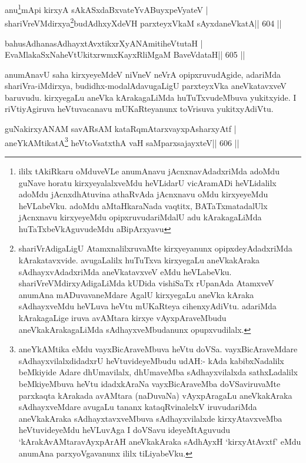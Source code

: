 \begin{shl}
anu\footnote{ililx tAkiRkaru oMduveVLe anumAnavu jAcnxnavAdadxriMda adoMdu guNave horatu kirxyeyalalxveMdu heVLidarU vicAramADi heVLidalilx adoMdu jAcnxdhAtuvina athaRvAda jAcnxnavu oMdu kirxyeyeMdu heVLabeVku. adoMdu aMtaHkaraNada vaqtitx, BATaTxmatadalUlx jAcnxnavu kirxyeyeMdu opipxruvudariMdalU adu kArakagaLiMda huTaTxbeVkAguvudeMdu aBipArxyavu}mApi kirxyA sAkASxdaBxvateYvABuyxpeVyateV | shariVreVMdirxya\footnote{shariVrAdigaLigU AtamxnalilxruvaMte kirxyeyanunx opipxdeyAdadxriMda kArakatavxvide. avugaLalilx huTuTxva kirxyegaLu aneVkakAraka sAdhayxvAdadxriMda aneVkatavxveV eMdu heVLabeVku. shariVreVMdirxyAdigaLiMda kUDida vishiSaTx rUpanAda AtamxveV anumAna mADuvavaneMdare AgalU kirxyegaLu aneVka kAraka sAdhayxveMdu heVLuva heVtu mUKaRteya cihenxyAdiVtu. adariMda kArakagaLige iruva avAMtara kirxye vAyxpAraveMbudu aneVkakArakagaLiMda sAdhayxveMbudanunx opupxvudilalx.}budAdhxyXdeVH parxteyxVkaM sAyxdaneVkatA\hfill || 604 ||
\end{shl}

\begin{shl}
bahusAdhanasAdhayxtAvxtikxrXyANAmitiheVtutaH |
EvaMlakaSxNaheVtUkitxrwmxKayxRliMgaM BaveVdataH\hfill || 605 ||
\end{shl}

\begin{artha}
anumAnavU saha kirxyeyeMdeV niVneV neVrA opipxruvudAgide, adariMda shariVra-iMdirxya, budidhx-modalAdavugaLigU parxteyxVka aneVkatavxveV baruvudu. kirxyegaLu aneVka kArakagaLiMda huTuTxvudeMbuva yukitxyide. I riVtiyAgiruva heVtuvacanavu mUKaRteyanunx toVrisuva yukitxyAdiVtu.
\end{artha}

\begin{shl}
guNakirxyANAM savARsAM kataRqmAtarxvayxpAsharxyAtf |
aneYkAMtikatA\footnote{aneYkAMtika eMdu vayxBicAraveMbuva heVtu doVSa. vayxBicAraveMdare sAdhayxvilalxdidadxrU heVtuvideyeMbudu udAH:- kAda kabibxNadalilx beMkiyide Adare dhUmavilalx, dhUmaveMba sAdhayxvilalxda sathxLadalilx beMkiyeMbuva heVtu idadxkAraNa vayxBicAraveMba doVSaviruvaMte parxkaqta kArakada avAMtara (naDuvaNa) vAyxpAragaLu aneVkakAraka sAdhayxveMdare avugaLu tananx kataqRvinalelxV iruvudariMda aneVkakAraka sAdhayxtavxveMbuva sAdhayxvilalxde kirxyAtavxveMba heVtuvideyeMdu heVLuvAga I doVSavu ideyeMtAguvudu `kArakAvAMtaravAyxpArAH aneVkakAraka sAdhAyxH `kirxyAtAvxtf' eMdu anumAna parxyoVgavanunx ililx tiLiyabeVku.} heVtoVsatxthA vaH saMparxsajayxteV\hfill || 606 ||
\end{shl}

